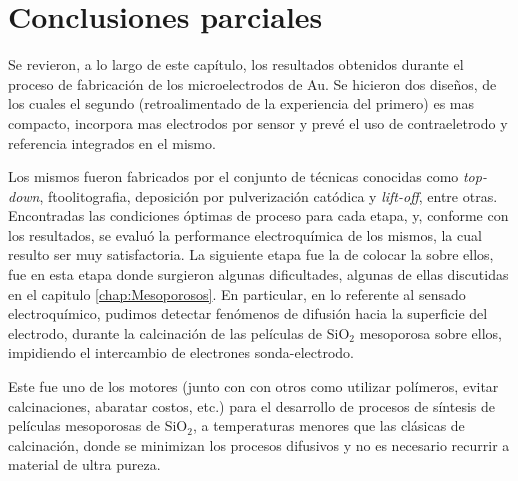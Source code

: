 

\section{Conclusiones parciales}

	Se revieron, a lo largo de este capítulo, los resultados obtenidos durante el proceso de fabricación de los microelectrodos de Au. Se hicieron dos diseños, de los cuales el segundo (retroalimentado de la experiencia del primero) es mas compacto, incorpora mas electrodos por sensor y prevé el uso de contraeletrodo y referencia integrados en el mismo.
	
	Los mismos fueron fabricados por el conjunto de técnicas conocidas como \textit{top-down}, ftoolitografia, deposición por
	pulverización catódica y \textit{lift-off}, entre otras. Encontradas las condiciones óptimas de proceso para cada etapa, y, conforme con los resultados, se evaluó la performance electroquímica de los mismos, la cual resulto ser muy satisfactoria. La siguiente etapa fue la de	colocar la \pdm\space sobre ellos, fue en esta etapa donde surgieron algunas dificultades, algunas de ellas discutidas en el capitulo \ref{chap:Mesoporosos}. En particular, en lo referente al sensado electroquímico, pudimos detectar fenómenos de difusión hacia la superficie del electrodo, durante la calcinación de las películas de SiO$_2$ mesoporosa sobre ellos, impidiendo el intercambio de electrones sonda-electrodo. 

	Este fue uno de los motores (junto con con otros como utilizar polímeros, evitar calcinaciones, abaratar costos, etc.) para el desarrollo de procesos de síntesis de películas mesoporosas de SiO$_2$, a temperaturas menores que las clásicas de calcinación, donde se minimizan los procesos difusivos y no es necesario recurrir a material de ultra pureza.
	
